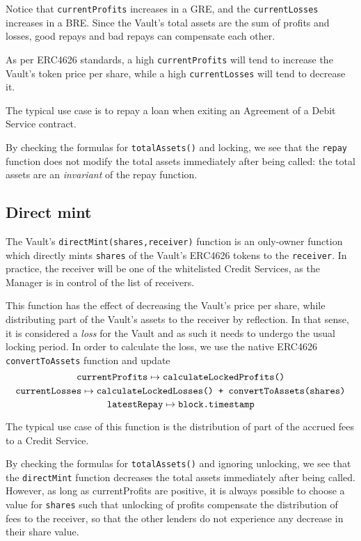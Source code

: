 \documentclass[a4paper,10 pt]{article}
\theoremstyle{definition}
\begin{document}
Notice that \verb|currentProfits| increases in a GRE, and the \verb|currentLosses| increases in a BRE. Since the Vault's total assets are the sum of profits and losses, good repays and bad repays can compensate each other.

As per ERC4626 standards, a high \verb|currentProfits| will tend to increase the Vault's token price per share, while a high \verb|currentLosses| will tend to decrease it.

The typical use case is to repay a loan when exiting an Agreement of a Debit Service contract.

By checking the formulas for \verb|totalAssets()| and locking, we see that the \verb|repay| function does not modify the total assets immediately after being called: the total assets are an {\it invariant} of the repay function.

\subsection{Direct mint}\label{directMint}
The Vault's \verb|directMint(shares,receiver)| function is an only-owner function which directly mints \verb|shares| of the Vault's ERC4626 tokens to the \verb|receiver|. In practice, the receiver will be one of the whitelisted Credit Services, as the Manager is in control of the list of receivers.

This function has the effect of decreasing the Vault's price per share, while distributing part of the Vault's assets to the receiver by reflection. In that sense, it is considered a {\it loss} for the Vault and as such it needs to undergo the usual locking period. In order to calculate the loss, we use the native ERC4626 \verb|convertToAssets| function and update 
$$\verb|currentProfits| \mapsto \verb|calculateLockedProfits()|$$ 
$$\verb|currentLosses| \mapsto \verb|calculateLockedLosses() + convertToAssets(shares)|$$ 
$$\verb|latestRepay| \mapsto \verb|block.timestamp|$$

The typical use case of this function is the distribution of part of the accrued fees to a Credit Service.

By checking the formulas for \verb|totalAssets()| and ignoring unlocking, we see that the \verb|directMint| function decreases the total assets immediately after being called. However, as long as currentProfits are positive, it is always possible to choose a value for \verb|shares| such that unlocking of profits compensate the distribution of fees to the receiver, so that the other lenders do not experience any decrease in their share value.
\end{document}
